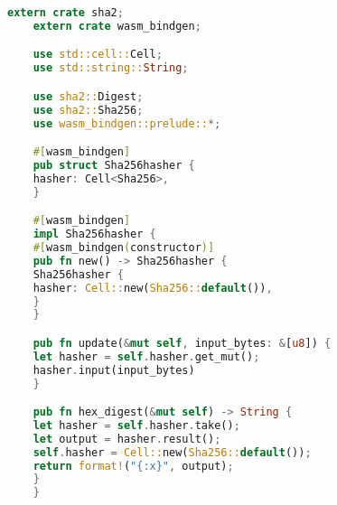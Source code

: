 \begin{lstlisting}[language=Rust]
    extern crate sha2;
    extern crate wasm_bindgen;

    use std::cell::Cell;
    use std::string::String;

    use sha2::Digest;
    use sha2::Sha256;
    use wasm_bindgen::prelude::*;

    #[wasm_bindgen]
    pub struct Sha256hasher {
    hasher: Cell<Sha256>,
    }

    #[wasm_bindgen]
    impl Sha256hasher {
    #[wasm_bindgen(constructor)]
    pub fn new() -> Sha256hasher {
    Sha256hasher {
    hasher: Cell::new(Sha256::default()),
    }
    }

    pub fn update(&mut self, input_bytes: &[u8]) {
    let hasher = self.hasher.get_mut();
    hasher.input(input_bytes)
    }

    pub fn hex_digest(&mut self) -> String {
    let hasher = self.hasher.take();
    let output = hasher.result();
    self.hasher = Cell::new(Sha256::default());
    return format!("{:x}", output);
    }
    }
\end{lstlisting}

